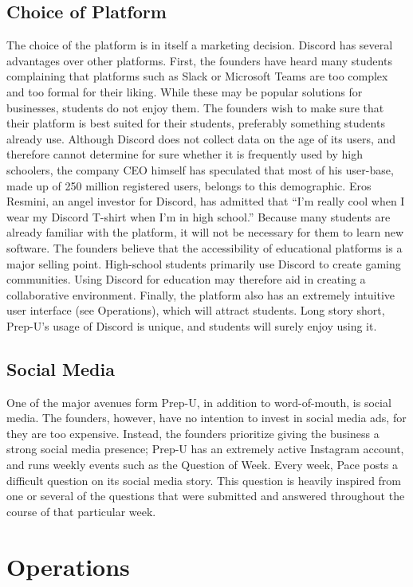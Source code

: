 \documentclass{business}
\begin{document}
    \subsection{Choice of Platform}\label{choice-of-platform}
    The choice of the platform is in itself a marketing decision. Discord has several advantages over other platforms. First, the founders have heard many students complaining that platforms such as Slack or Microsoft Teams are too complex and too formal for their liking. While these may be popular solutions for businesses, students do not enjoy them. The founders wish to make sure that their platform is best suited for their students, preferably something students already use. Although Discord does not collect data on the age of its users, and therefore cannot determine for sure whether it is frequently used by high schoolers, the company CEO himself has speculated that most of his user-base, made up of 250 million registered users, \cite{Sherr2019} belongs to this demographic. Eros Resmini, an angel investor for Discord, has admitted that “I’m really cool when I wear my Discord T-shirt when I’m in high school.” \cite{Jargon2019} Because many students are already familiar with the platform, it will not be necessary for them to learn new software. The founders believe that the accessibility of educational platforms is a major selling point. High-school students primarily use Discord to create gaming communities. Using Discord for education may therefore aid in creating a collaborative environment. Finally, the platform also has an extremely intuitive user interface (see Operations), which will attract students. Long story short, Prep-U’s usage of Discord is unique, and students will surely enjoy using it. 
    \subsection{Social Media}
    One of the major avenues form Prep-U, in addition to word-of-mouth, is social media. The founders, however, have no intention to invest in social media ads, for they are too expensive. Instead, the founders prioritize giving the business a strong social media presence; Prep-U has an extremely active Instagram account, and runs weekly events such as the Question of Week. Every week, Pace posts a difficult question on its social media story. This question is heavily inspired from one or several of the questions that were submitted and answered throughout the course of that particular week.
    \section{Operations}\label{operations}
\end{document}
